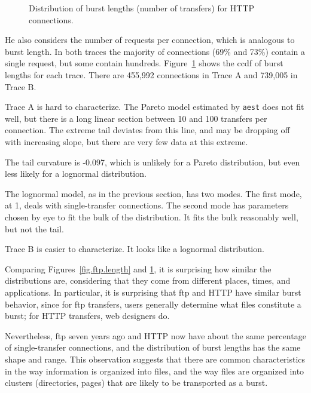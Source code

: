 \documentclass[twocolumn,11pt]{infocom}
\begin{document}
\begin{figure}[tb]
\centerline{}
\vspace{0.1in}
\centerline{}
\caption{Distribution of burst lengths (number of transfers) for
HTTP connections.}
\label{fig.http.length}
\end{figure}

He also considers the number of requests per connection, which is
analogous to burst length.  In both
traces the majority of connections 
(69\% and 73\%) contain a single request, but some contain
hundreds.  Figure~\ref{fig.http.length} shows the ccdf of
burst lengths for each trace.  There are 455,992 connections in
Trace A and 739,005 in Trace B.

Trace A is hard to characterize.  The Pareto model estimated
by \texttt{aest} does not fit well, but there is a long linear
section between 10 and 100 transfers per connection.  The
extreme tail deviates from this line, and may be dropping
off with increasing slope, but there are very few data at
this extreme.

The tail curvature is -0.097, which is
unlikely for a Pareto distribution, but even less likely
for a lognormal distribution.

The lognormal model, as in the previous section, has two modes.  The
first mode, at 1, deals with single-transfer connections.  The second
mode has parameters chosen by eye to fit the bulk of the distribution.
It fits the bulk reasonably well, but not the tail.

Trace B is easier to characterize.  It looks like a 
lognormal distribution.

Comparing Figures~\ref{fig.ftp.length} and \ref{fig.http.length}, it
is surprising how similar the distributions are, considering that they
come from different places, times, and applications.  In particular,
it is surprising that ftp and HTTP have similar burst behavior, since
for ftp transfers, users generally determine what files constitute a
burst; for HTTP transfers, web designers do.

Nevertheless, ftp seven years ago and HTTP now have about the same
percentage of single-transfer connections, and the distribution of
burst lengths has the same shape and range.  This observation suggests
that there are common characteristics in the way information is
organized into files, and the way files are organized into clusters
(directories, pages) that are likely to be transported as a burst.
\end{document}
